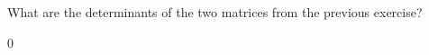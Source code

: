 What are the determinants of the two matrices from the previous exercise?

\begin{solution}
0
\end{solution}